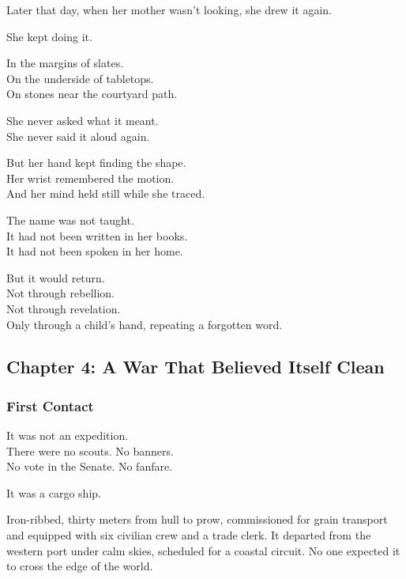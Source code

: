 \documentclass[12pt]{article}
\begin{document}
Later that day, when her mother wasn’t looking, she drew it again.

\vspace{1em}

She kept doing it.

In the margins of slates.\\
On the underside of tabletops.\\
On stones near the courtyard path.

She never asked what it meant.\\
She never said it aloud again.

But her hand kept finding the shape.\\
Her wrist remembered the motion.\\
And her mind held still while she traced.

\vspace{1em}

The name was not taught.\\
It had not been written in her books.\\
It had not been spoken in her home.

But it would return.\\
Not through rebellion.\\
Not through revelation.\\
Only through a child’s hand, repeating a forgotten word.

\newpage

\subsection{Chapter 4: A War That Believed Itself Clean}

\vspace{.5in}

\subsubsection{First Contact}

It was not an expedition.\\
There were no scouts. No banners.\\
No vote in the Senate. No fanfare.

It was a cargo ship.

Iron-ribbed, thirty meters from hull to prow, commissioned for grain transport and equipped with six civilian crew and a trade clerk. It departed from the western port under calm skies, scheduled for a coastal circuit. No one expected it to cross the edge of the world.
\end{document}
